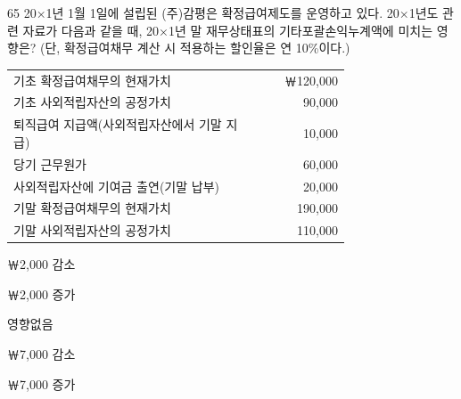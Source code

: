 \begin{question}{65}
20×1년 1월 1일에 설립된 (주)감평은 확정급여제도를 운영하고 있다. 20×1년도 관련 자료가 다음과 같을 때, 20×1년 말 재무상태표의 기타포괄손익누계액에 미치는 영향은? (단, 확정급여채무 계산 시 적용하는 할인율은 연 10\%이다.)
\begin{framedtext}
\begin{tabular}{@{}p{0.75\linewidth}r@{}}
기초 확정급여채무의 현재가치 & ￦120,000 \tabularnewline
기초 사외적립자산의 공정가치 & 90,000 \tabularnewline
퇴직급여 지급액(사외적립자산에서 기말 지급) & 10,000 \tabularnewline
당기 근무원가 & 60,000 \tabularnewline
사외적립자산에 기여금 출연(기말 납부) & 20,000 \tabularnewline
기말 확정급여채무의 현재가치 & 190,000 \tabularnewline
기말 사외적립자산의 공정가치 & 110,000 \tabularnewline
\end{tabular}
\end{framedtext}
\begin{choices}
  \item ￦2,000 감소
  \item ￦2,000 증가
  \item 영향없음
  \item ￦7,000 감소
  \item ￦7,000 증가
\end{choices}
\end{question}
